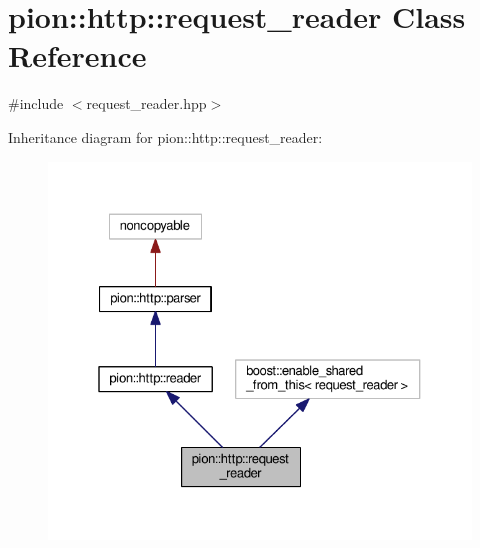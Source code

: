 \hypertarget{classpion_1_1http_1_1request__reader}{\section{pion\-:\-:http\-:\-:request\-\_\-reader Class Reference}
\label{classpion_1_1http_1_1request__reader}
}


{\ttfamily \#include $<$request\-\_\-reader.\-hpp$>$}



Inheritance diagram for pion\-:\-:http\-:\-:request\-\_\-reader\-:
\nopagebreak
\begin{figure}[H]
\begin{center}
\leavevmode
\includegraphics[width=327pt]{classpion_1_1http_1_1request__reader__inherit__graph}
\end{center}
\end{figure}


